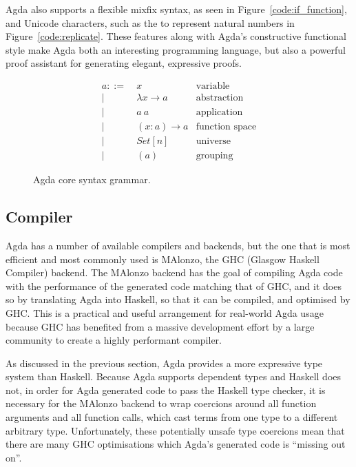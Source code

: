 Agda also supports a flexible mixfix syntax, as seen in Figure~\ref{code:if_function}, and Unicode characters, such as the  to represent natural numbers in Figure~\ref{code:replicate}. These features along with Agda's constructive functional style make Agda both an interesting programming language, but also a powerful proof assistant for generating elegant, expressive proofs.



\begin{figure}[h]
\begin{align*}
a ::=~& x               & \text{variable}\\
    |~& \lambda x \to a & \text{abstraction}\\
    |~& a~a             & \text{application}\\
    |~& (x : a) \to a   & \text{function space}\\
    |~& Set[n]          & \text{universe}\\
    |~& (a)             & \text{grouping}
\end{align*}
\caption{Agda core syntax grammar.\cite{agdawiki}}
\label{fig:grammar}
\end{figure}

\subsection{Compiler}

Agda has a number of available compilers and backends, but the one that is most efficient and most commonly used is MAlonzo, the GHC (Glasgow Haskell Compiler) backend.\cite{benke2007} The MAlonzo backend has the goal of compiling Agda code with the performance of the generated code matching that of GHC, and it does so by translating Agda into Haskell, so that it can be compiled, and optimised by GHC. This is a practical and useful arrangement for real-world Agda usage because GHC has benefited from a massive development effort by a large community to create a highly performant compiler.\cite{benke2007}

As discussed in the previous section, Agda provides a more expressive type system than Haskell. Because Agda supports dependent types and Haskell does not, in order for Agda generated code to pass the Haskell type checker, it is necessary for the MAlonzo backend to wrap coercions around all function arguments and all function calls, which cast terms from one type to a different arbitrary type. Unfortunately, these potentially unsafe type coercions mean that there are many GHC optimisations which Agda's generated code is ``missing out on''.\cite{fredriksson2011}

